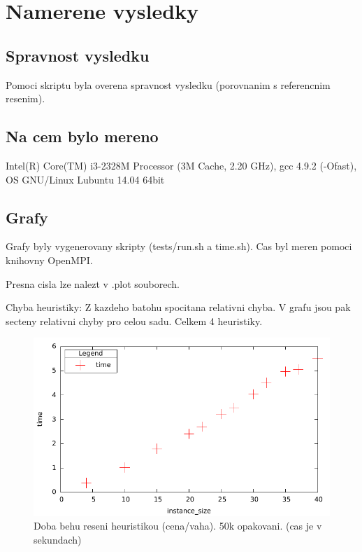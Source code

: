 \documentclass[12pt,a4paper]{article}
\begin{document}
\section{Namerene vysledky}

\subsection{Spravnost vysledku}
Pomoci skriptu byla overena spravnost vysledku (porovnanim s referencnim resenim).

\subsection{Na cem bylo mereno}
Intel(R) Core(TM) i3-2328M Processor (3M Cache, 2.20 GHz), gcc 4.9.2 (-Ofast), OS GNU/Linux Lubuntu 14.04 64bit

\subsection{Grafy}
Grafy byly vygenerovany skripty (tests/run.sh a time.sh). Cas byl meren pomoci knihovny OpenMPI.

Presna cisla lze nalezt v .plot souborech.

Chyba heuristiky: Z kazdeho batohu spocitana relativni chyba. V grafu jsou pak secteny relativni chyby pro celou sadu. Celkem 4 heuristiky.

\begin{figure}[H]
	\caption{Doba behu reseni heuristikou (cena/vaha). 50k opakovani. (cas je v sekundach)}
	\includegraphics{./time_h.png}
\end{figure}
\end{document}
